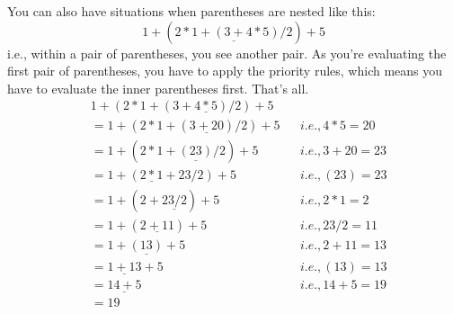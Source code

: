 %
%

You can also have situations when parentheses are nested like this:
\[1 + (\underline{2 * 1 + (3 + 4 * 5) / 2}) + 5\]
i.e., within a pair of parentheses, you see another pair. As you're
evaluating the first pair of parentheses, you have to apply the priority
rules, which means you have to evaluate the inner parentheses first.
That's all.
\begin{align*}
  &1 + (2 * 1 + (3 + \underline{4 * 5}) / 2) + 5\\
  &= 1 + (2 * 1 + (\underline{3 + 20}) / 2) + 5 & &i.e., 4 * 5 = 20\\
  &= 1 + (2 * 1 + \underline{(23)} / 2) + 5 & &i.e., 3 + 20 = 23\\
  &= 1 + (\underline{2 * 1} + 23 / 2) + 5 & &i.e., (23) = 23\\
  &= 1 + (2 + \underline{23 / 2}) + 5 & &i.e., 2 * 1 = 2\\
  &= 1 + (\underline{2 + 11}) + 5 & &i.e., 23/ 2 = 11\\
  &= 1 + \underline{(13)} + 5 & &i.e., 2 + 11 = 13\\
  &= \underline{1 + 13} + 5 & &i.e., (13) = 13\\
  &= \underline{14 + 5} & &i.e., 14 + 5 = 19\\
  &= 19
\end{align*}

%
%
%
%
%
%


